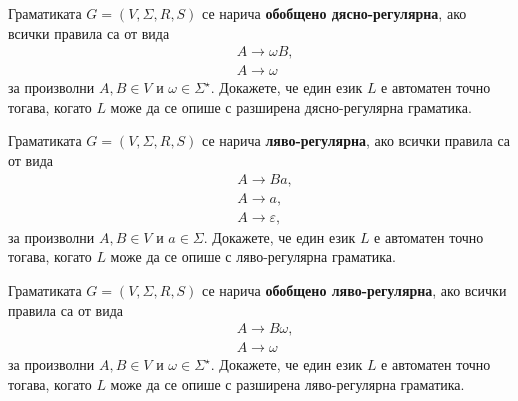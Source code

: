 \begin{extra}

\begin{problem}
  Граматиката $G = (V, \Sigma, R, S)$ се нарича {\bf обобщено дясно-регулярна},
  ако всички правила са от вида 
  \begin{align*}
    & A \to \omega B,\\
    & A \to \omega
  \end{align*}
  за произволни $A, B \in V$ и $\omega \in \Sigma^\star$.
  Докажете, че един език $L$ е автоматен точно тогава, когато $L$ може да се опише с разширена дясно-регулярна граматика.
\end{problem}

\begin{problem}
  Граматиката $G = (V, \Sigma, R, S)$ се нарича {\bf ляво-регулярна},
  ако всички правила са от вида 
  \begin{align*}
    & A \to Ba,\\
    & A \to a,\\
    & A \to \varepsilon,
  \end{align*}
  за произволни $A, B \in V$ и $a \in \Sigma$.
  Докажете, че един език $L$ е автоматен точно тогава, когато $L$ може да се опише с ляво-регулярна граматика.
\end{problem}

\begin{problem}
  Граматиката $G = (V, \Sigma, R, S)$ се нарича {\bf обобщено ляво-регулярна},
  ако всички правила са от вида 
  \begin{align*}
    & A \to B\omega,\\
    & A \to \omega
  \end{align*}
  за произволни $A, B \in V$ и $\omega \in \Sigma^\star$.
  Докажете, че един език $L$ е автоматен точно тогава, когато $L$ може да се опише с разширена ляво-регулярна граматика.
\end{problem}

\end{extra}


